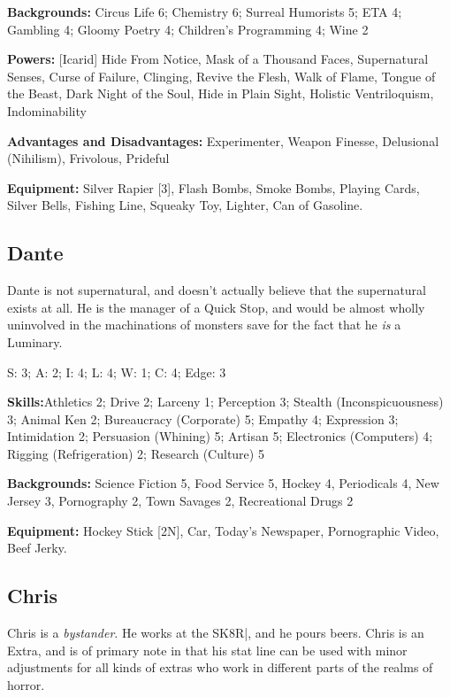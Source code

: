\textbf{Backgrounds:} Circus Life 6; Chemistry 6;  Surreal Humorists 5; ETA 4; Gambling 4; Gloomy Poetry 4; Children's Programming 4; Wine 2

\textbf{Powers:} [Icarid] Hide From Notice, Mask of a Thousand Faces, Supernatural Senses, Curse of Failure, Clinging, Revive the Flesh, Walk of Flame, Tongue of the Beast, Dark Night of the Soul, Hide in Plain Sight, Holistic Ventriloquism, Indominability

\textbf{Advantages and Disadvantages:} Experimenter, Weapon Finesse, Delusional (Nihilism), Frivolous, Prideful

\textbf{Equipment:} Silver Rapier [3], Flash Bombs, Smoke Bombs, Playing Cards, Silver Bells, Fishing Line, Squeaky Toy, Lighter, Can of Gasoline.

\subsection{Dante}
\hspace{\parindent} Dante is not supernatural, and doesn't actually believe that the supernatural exists at all. He is the manager of a Quick Stop, and would be almost wholly uninvolved in the machinations of monsters save for the fact that he \textit{is} a Luminary.

S: 3; A: 2; I: 4; L: 4; W: 1; C: 4; Edge: 3

\textbf{Skills:}Athletics 2; Drive 2; Larceny 1; Perception 3; Stealth (Inconspicuousness) 3; 
Animal Ken 2; Bureaucracy (Corporate) 5; Empathy 4; Expression 3; Intimidation 2; Persuasion (Whining) 5;
Artisan 5; Electronics (Computers) 4; Rigging (Refrigeration) 2; Research (Culture) 5

\textbf{Backgrounds:} Science Fiction 5, Food Service 5, Hockey 4, Periodicals 4, New Jersey 3, Pornography 2, Town Savages 2, Recreational Drugs 2

\textbf{Equipment:} Hockey Stick [2N], Car, Today's Newspaper, Pornographic Video, Beef Jerky.

\subsection{Chris}
\hspace{\parindent} Chris is a \textit{bystander}. He works at the SK8R|, and he pours beers. Chris is an Extra, and is of primary note in that his stat line can be used with minor adjustments for all kinds of extras who work in different parts of the realms of horror.

